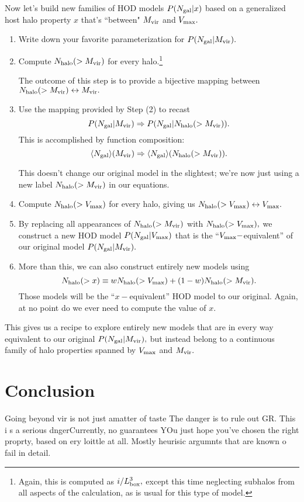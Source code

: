 \documentclass[usenatbib,usegraphicx,letterpaper]{mn2e}
\newcommand{\Ngal}{N_{\rm gal}}
\newcommand{\Nhalo}{N_{\rm halo}}
\newcommand{\vmax}{V_{\rm max}}
\newcommand{\mvir}{M_{\rm vir}}
\newcommand{\ben}{\begin{enumerate}}
\newcommand{\een}{\end{enumerate}}
\begin{document}
Now let's build new families of HOD models $P(\Ngal|x)$ based on a generalized host halo property $x$ that's ``between" $\mvir$ and $\vmax.$ 

\ben
\item Write down your favorite parameterization for $P(\Ngal | \mvir).$
\item Compute $\Nhalo(>\mvir)$ for every halo.\footnote{Again, this is computed as $i/L_{\rm box}^{3},$ except this time neglecting subhalos from all aspects of the calculation, as is usual for this type of model.} 

The outcome of this step is to provide a bijective mapping between $\Nhalo(>\mvir)\leftrightarrow\mvir.$ 
\item Use the mapping provided by Step (2) to recast $$P(\Ngal | \mvir)\Rightarrow P(\Ngal |\Nhalo(>\mvir)).$$
This is accomplished by function composition: $$\langle\Ngal\rangle(\mvir)\Rightarrow\langle\Ngal\rangle(\Nhalo(>\mvir)).$$

This doesn't change our original model in the slightest; we're now just using a new label $\Nhalo(>\mvir)$ in our equations.
\item Compute $\Nhalo(>\vmax)$ for every halo, giving us $\Nhalo(>\vmax)\leftrightarrow\vmax.$ 
\item By replacing all appearances of $\Nhalo(>\mvir)$ with $\Nhalo(>\vmax),$ 
we construct a new HOD model $P(\Ngal|\vmax)$ that is the ``$\vmax-$equivalent'' of our original model $P(\Ngal | \mvir).$
\item More than this, we can also construct entirely new models using $$\Nhalo(>x) \equiv w\Nhalo(>\vmax) + (1-w)\Nhalo(>\mvir).$$ 
Those models will be the ``$x-$equivalent'' HOD model to our original. Again, at no point do we ever need to compute the value of $x.$
\een

This gives us a recipe to explore entirely new models that are in every way equivalent to our original $P(\Ngal | \mvir),$ but instead belong to a continuous family of halo properties spanned by $\vmax$ and $\mvir.$

\section{Conclusion}

Going beyond vir is not just  amatter of taste The danger is to rule out GR. This i s a serious dngerCurrently, no guarantees YOu just hope you've chosen the right proprty, based on ery loittle at all. Mostly heurisic argumnts that are known o fail in detail. 



\end{document}
